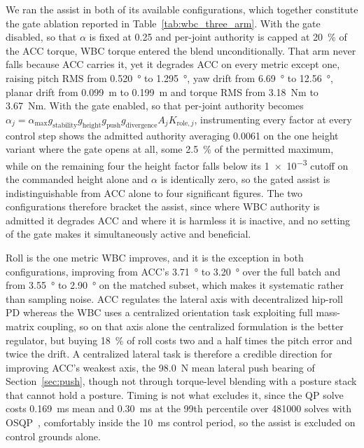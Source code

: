 \documentclass[a4paper,fleqn]{cas-dc}
\begin{document}
We ran the assist in both of its available configurations, which together
constitute the gate ablation reported in Table~\ref{tab:wbc_three_arm}. With the
gate disabled, so that $\alpha$ is fixed at \num{0.25} and per-joint authority is
capped at \SI{20}{\percent} of the ACC torque, WBC torque entered the blend
unconditionally. That arm never falls because ACC carries it, yet it degrades ACC
on every metric except one, raising pitch RMS
from \SI{0.520}{\degree} to \SI{1.295}{\degree}, yaw drift from
\SI{6.69}{\degree} to \SI{12.56}{\degree}, planar drift from \SI{0.099}{m} to
\SI{0.199}{m} and torque RMS from \SI{3.18}{Nm} to \SI{3.67}{Nm}. With the gate
enabled, so that per-joint authority becomes $\alpha_{j} =
\alpha_{\max}g_{\text{stability}}g_{\text{height}}g_{\text{push}}g_{\text{divergence}}A_jK_{\text{role},j}$,
instrumenting every factor at every control step shows the admitted authority
averaging \num{0.0061} on the one height variant where the gate opens at all,
some \SI{2.5}{\percent} of the permitted maximum, while on the remaining four the
height factor falls below its \num{1e-3} cutoff on the commanded height alone and
$\alpha$ is identically zero, so the gated assist is indistinguishable from ACC
alone to four significant figures. The two configurations therefore bracket the
assist, since where WBC authority is admitted it degrades ACC and
where it is harmless it is inactive, and no setting of the gate makes it
simultaneously active and beneficial.

Roll is the one metric WBC improves, and it is the exception in both
configurations, improving from ACC's \SI{3.71}{\degree} to \SI{3.20}{\degree}
over the full batch and from \SI{3.55}{\degree} to \SI{2.90}{\degree} on the
matched subset, which makes it systematic rather than sampling noise. ACC
regulates the lateral axis with decentralized hip-roll PD whereas the WBC uses a
centralized orientation task exploiting full mass-matrix coupling, so on that
axis alone the centralized formulation is the better regulator, but buying
\SI{18}{\percent} of roll costs two and a half times the pitch error and twice
the drift. A centralized lateral task is therefore a credible direction for
improving ACC's weakest axis, the \SI{98.0}{N} mean lateral push bearing of
Section~\ref{sec:push}, though not through torque-level blending with a posture
stack that cannot hold a posture. Timing is not what excludes it, since the QP
solve costs \SI{0.169}{ms} mean and \SI{0.30}{ms} at the 99th percentile over
\num{481000} solves with OSQP~\cite{stellato2020osqp}, comfortably inside the
\SI{10}{ms} control period, so the assist is excluded on control grounds alone.
\end{document}
